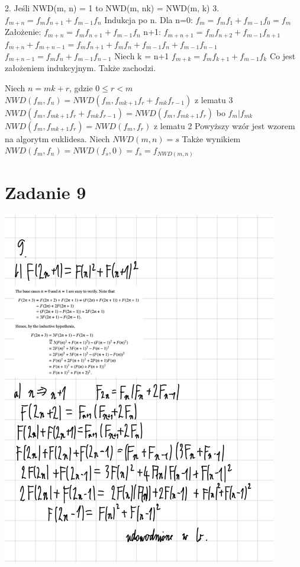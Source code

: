 \documentclass[12pt]{article}
\begin{document}
2. Jeśli NWD(m, n) = 1 to NWD(m, nk) = NWD(m, k)
3. $f_{m+n} = f_mf_{n+1} + f_{m-1}f_n$
Indukcja po n. Dla n=0:
$f_m = f_mf_1 + f_{m-1}f_0 = f_m$
Założenie: $f_{m+n} = f_mf_{n+1} + f_{m-1}f_n$
n+1:
$f_{m+n+1} = f_mf_{n+2} + f_{m-1}f_{n+1}$
$f_{m+n} + f_{m+n-1}  = f_mf_{n+1} + f_mf_{n}  + f_{m-1}f_{n} + f_{m-1}f_{n-1}$
$f_{m+n-1} = f_mf_{n} + f_{m-1}f_{n-1}$
Niech k = n+1 
$f_{m+k} = f_mf_{k+1} + f_{m-1}f_k$
Co jest założeniem indukcyjnym.
Także zachodzi.


Niech $n = mk+r$, gdzie $0 \leq r < m$
$NWD(f_m, f_n) = NWD(f_m, f_{mk+1}f_r + f_{mk}f_{r-1})$ z lematu 3
$NWD(f_m, f_{mk+1}f_r + f_{mk}f_{r-1}) = NWD(f_m, f_{mk+1}f_r)$ bo $f_m|f_{mk}$
$NWD(f_m, f_{mk+1}f_r) = NWD(f_m, f_r)$ z lematu 2
Powyższy wzór jest wzorem na algorytm euklidesa. 
Niech $NWD(m,n) = s$
Także wynikiem $NWD(f_m, f_n) = NWD(f_s, 0) = f_s = f_{NWD(m, n)}$



\section{Zadanie 9}
\includegraphics[width=120mm]{zad9}
\end{document}
